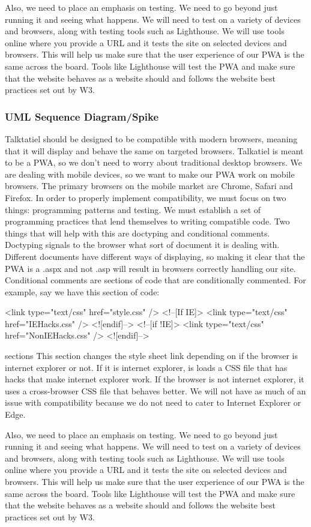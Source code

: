 \documentclass[12pt]{article}
\begin{document}
Also, we need to place an emphasis on testing.  We need to go beyond just running it and seeing what happens.  We will need to test on a variety of devices and browsers, along with testing tools such as Lighthouse.  We will use tools online where you provide a URL and it tests the site on selected devices and browsers.  This will help us make sure that the user experience of our PWA is the same across the board.  Tools like Lighthouse will test the PWA and make sure that the website behaves as a website should and follows the website best practices set out by W3.

\subsubsection{UML Sequence Diagram/Spike}
Talktatiel should be designed to be compatible with modern browsers, meaning that it will display and behave the same on targeted browsers.  Talkatiel is meant to be a PWA, so we don’t need to worry about traditional desktop browsers.  We are dealing with mobile devices, so we want to make our PWA work on mobile browsers.  The primary browsers on the mobile market are Chrome, Safari and Firefox.  In order to properly implement compatibility, we must focus on two things: programming patterns and testing.  We must establish a set of programming practices that lend themselves to writing compatible code.  Two things that will help with this are doctyping and conditional comments.  Doctyping signals to the browser what sort of document it is dealing with.  Different documents have different ways of displaying, so making it clear that the PWA is a .aspx and not .asp will result in browsers correctly handling our site.  Conditional comments are sections of code that are conditionally commented.  For example, say we have this section of code:

<link type="text/css" href="style.css" />
<!--[If IE]>
<link type="text/css" href="IEHacks.css" />
<![endif]-->
<!--[if !IE]>
<link type="text/css" href="NonIEHacks.css" />
<![endif]-->

sections This section changes the style sheet link depending on if the browser is internet explorer or not.  If it is internet explorer, is loads a CSS file that has hacks that make internet explorer work.  If the browser is not internet explorer, it uses a cross-browser CSS file that behaves better.  We will not have as much of an issue with compatibility because we do not need to cater to Internet Explorer or Edge.

Also, we need to place an emphasis on testing.  We need to go beyond just running it and seeing what happens.  We will need to test on a variety of devices and browsers, along with testing tools such as Lighthouse.  We will use tools online where you provide a URL and it tests the site on selected devices and browsers.  This will help us make sure that the user experience of our PWA is the same across the board.  Tools like Lighthouse will test the PWA and make sure that the website behaves as a website should and follows the website best practices set out by W3.
\end{document}
